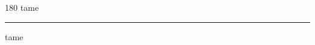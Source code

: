 
\begin{frame}
\begin{center}
\begin{turn}{180}
{\fontsize{2.5cm}{1em}\selectfont tame}
\end{turn}
\vspace{1em}\par  
\hrule
\vspace{1em}\par  
{\fontsize{2.5cm}{1em}\selectfont tame}
\end{center}
\end{frame}
